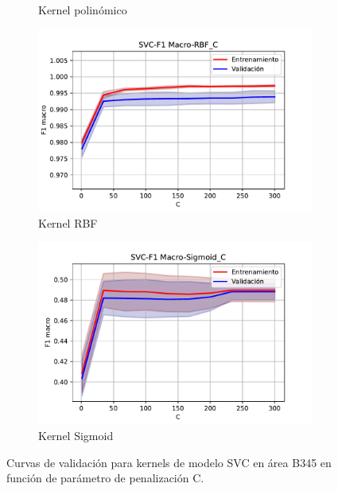 \begin{figure}[H]
\begin{subfigure}[b]{.45\linewidth}
		\caption{Kernel polinómico}
		\label{res:svc_vc_poly_b345}
	\end{subfigure}
	\begin{subfigure}[b]{.45\linewidth}
		\includegraphics[width=\linewidth]{imagenes/resultados/svm/curvas_validacion/b345/SVC-F1 Macro-rbf_C.pdf}
		\caption{Kernel RBF}
		\label{res:svc_vc_rbf_b345}
	\end{subfigure}
	\begin{subfigure}[b]{.45\linewidth}
		\includegraphics[width=\linewidth]{imagenes/resultados/svm/curvas_validacion/b345/SVC-F1 Macro-sigmoid_C.pdf}
		\caption{Kernel Sigmoid}
		\label{res:svc_vc_sigmoid_b345}
	\end{subfigure}
	\caption{Curvas de validación para kernels de modelo SVC en área B345 en función de parámetro de penalización C.}
	\label{res:svc_vc_b345}
\end{figure}

